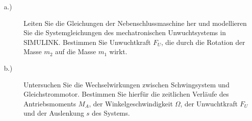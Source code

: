 
\label{Aufgabenstellung}

\begin{description}
	\item[a.)]
	Leiten Sie die Gleichungen der Nebenschlussmaschine her und modellieren Sie die Systemgleichungen des mechatronischen Unwuchtsystems in SIMULINK. Bestimmen Sie Unwuchtkraft $F_U$, die durch die Rotation der Masse $m_2$ auf die Masse $m_1$ wirkt.
	\item[b.)]
	Untersuchen Sie die Wechselwirkungen zwischen Schwingsystem und Gleichstrommotor. Bestimmen Sie hierfür die zeitlichen Verläufe des Antriebsmoments $M_A$, der Winkelgeschwindigkeit $\Omega$, der Unwuchtkraft $F_U$ und der Auslenkung $s$ des Systems.
\end{description}